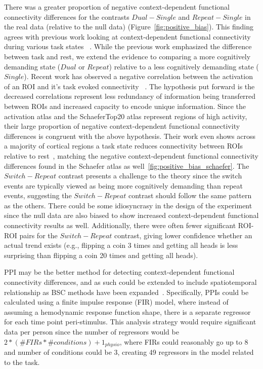 \documentclass[phd,figures,tables,ackpage,abstractpage,publicabstractpage]{uithesis}
\begin{document}
There was a greater proportion of negative context-dependent functional connectivity
differences for the contrasts
$Dual - Single$ and $Repeat - Single$ in the real data (relative to the null data)
(Figure~\ref{fig:positive_bias}).
This finding agrees with previous work looking at
context-dependent functional connectivity during various task states
~\cite{Cole2014a,Spadone2015,Di2019a,He2013,Ito2019,Hearne2020}.
While the previous work emphasized the difference between task and rest, we extend
the evidence to comparing a more cognitively demanding state ($Dual$ or $Repeat$)
relative to a less cognitively demanding state ($Single$).
Recent work has observed a negative correlation between the activation of an ROI
and it's task evoked connectivity ~\cite{Hearne2020}.
The hypothesis put forward is the decreased correlations represent less redundancy of
information being transferred between ROIs and increased capacity to encode unique information.
Since the activation atlas and the SchaeferTop20 atlas represent
regions of high activity, their large proportion of negative
context-dependent functional connectivity differences
is congruent with the above hypothesis.
Their work even shows across a majority of cortical
regions a task state reduces
connectivity between ROIs relative to rest~\cite{Ito2019},
matching the negative context-dependent functional connectivity differences
found in the Schaefer atlas as well~\ref{fig:positive_bias_schaefer}.
The $Switch - Repeat$ contrast presents a challenge to the theory since
the switch events are typically viewed as being more cognitively demanding than repeat events,
suggesting the $Switch - Repeat$ contrast should follow the same pattern as the others.
There could be some idiosyncrasy in the design of the experiment since the null data are also
biased to show increased context-dependent functional connectivity results as well.
Additionally, there were often fewer significant ROI-ROI pairs for the $Switch - Repeat$ contrast,
giving lower confidence whether an actual
trend exists (e.g., flipping a coin 3 times and getting all heads
is less surprising than flipping a coin 20 times and getting all heads).

PPI may be the better method for detecting context-dependent functional connectivity
differences, and as such could be extended to include spatiotemporal relationship as BSC methods
have been expanded~\cite{Turner2012a}.
Specifically, PPIs could be calculated using a finite impulse response (FIR) model, where instead of assuming
a hemodynamic response function shape, there is a separate regressor for each time point peri-stimulus.
This analysis strategy would require significant data per person since the number of regressors would be
$2 * (\#FIRs * \#conditions) + 1_{physio}$, where FIRs could reasonably go up to 8 and number of conditions could
be 3, creating 49 regressors in the model related to the task.
\end{document}
